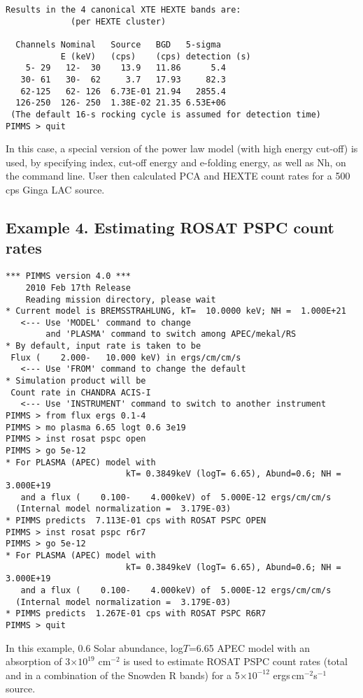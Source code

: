 \documentclass[11pt]{article}
\begin{document}
\begin{verbatim}
Results in the 4 canonical XTE HEXTE bands are:
             (per HEXTE cluster)

  Channels Nominal   Source   BGD   5-sigma
           E (keV)   (cps)    (cps) detection (s)
    5- 29   12-  30    13.9   11.86      5.4
   30- 61   30-  62     3.7   17.93     82.3
   62-125   62- 126  6.73E-01 21.94   2855.4
  126-250  126- 250  1.38E-02 21.35 6.53E+06
 (The default 16-s rocking cycle is assumed for detection time)
PIMMS > quit
\end{verbatim}

In this case, a special version of the power law model (with high
energy cut-off) is used, by specifying index, cut-off energy and
e-folding energy, as well as Nh, on the command line.  User then
calculated PCA and HEXTE count rates for a 500 cps Ginga LAC source.

\subsection*{Example 4. Estimating ROSAT PSPC count rates}

\begin{verbatim}
*** PIMMS version 4.0 ***
    2010 Feb 17th Release
    Reading mission directory, please wait
* Current model is BREMSSTRAHLUNG, kT=  10.0000 keV; NH =  1.000E+21
   <--- Use 'MODEL' command to change
        and 'PLASMA' command to switch among APEC/mekal/RS
* By default, input rate is taken to be
 Flux (    2.000-   10.000 keV) in ergs/cm/cm/s
   <--- Use 'FROM' command to change the default
* Simulation product will be
 Count rate in CHANDRA ACIS-I
   <--- Use 'INSTRUMENT' command to switch to another instrument
PIMMS > from flux ergs 0.1-4
PIMMS > mo plasma 6.65 logt 0.6 3e19
PIMMS > inst rosat pspc open
PIMMS > go 5e-12
* For PLASMA (APEC) model with
                        kT= 0.3849keV (logT= 6.65), Abund=0.6; NH =  3.000E+19
   and a flux (    0.100-    4.000keV) of  5.000E-12 ergs/cm/cm/s
  (Internal model normalization =  3.179E-03)
* PIMMS predicts  7.113E-01 cps with ROSAT PSPC OPEN
PIMMS > inst rosat pspc r6r7
PIMMS > go 5e-12
* For PLASMA (APEC) model with
                        kT= 0.3849keV (logT= 6.65), Abund=0.6; NH =  3.000E+19
   and a flux (    0.100-    4.000keV) of  5.000E-12 ergs/cm/cm/s
  (Internal model normalization =  3.179E-03)
* PIMMS predicts  1.267E-01 cps with ROSAT PSPC R6R7
PIMMS > quit
\end{verbatim}

In this example, 0.6 Solar abundance, log$T$=6.65 APEC model with
an absorption of 3$\times10^{19}$ cm$^{-2}$ is used to estimate ROSAT PSPC
count rates (total and in a combination of the Snowden R bands) for a
5$\times 10^{-12}$ ergs\,cm$^{-2}$s$^{-1}$ source.
\end{document}
